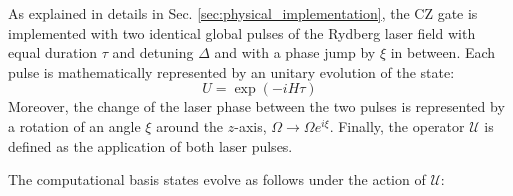 \documentclass[rmp,10pt,onecolumn,fleqn,notitlepage]{revtex4-1}
\begin{document}
As explained in details in Sec. \ref{sec:physical_implementation}, the CZ gate is implemented with two identical global pulses of the Rydberg laser field with equal duration $\tau$ and detuning $\Delta$ and with a phase jump by $\xi$ in between. Each pulse is mathematically represented by an unitary evolution of the state:
\begin{equation}
    U = \exp(-i H \tau)
    \label{eq:unitary_evolution}
\end{equation}
Moreover, the change of the laser phase between the two pulses is represented by a rotation of an angle $\xi$ around the $z$-axis, $\Omega \rightarrow \Omega e^{i\xi}$. Finally, the operator $\mathcal{U}$ is defined as the application of both laser pulses. 

The computational basis states evolve as follows under the action of $\mathcal{U}$:
\end{document}
